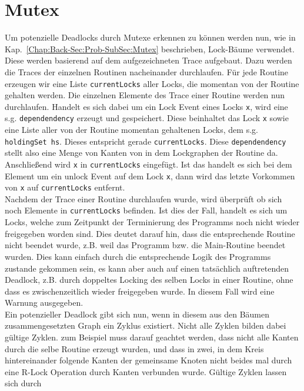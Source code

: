 \section{Mutex} \label{Chap:Implement-Sec:Mutex}
Um potenzielle Deadlocks durch Mutexe erkennen zu können werden nun, wie in 
Kap.~\ref{Chap:Back-Sec:Prob-SubSec:Mutex} beschrieben, Lock-Bäume verwendet.
Diese werden basierend auf dem aufgezeichneten Trace aufgebaut. Dazu werden die Traces der 
einzelnen Routinen nacheinander durchlaufen. Für jede Routine erzeugen wir eine Liste \texttt{currentLocks} aller 
Locks, die momentan von der Routine gehalten werden. Die einzelnen Elemente des Trace einer 
Routine werden nun durchlaufen. Handelt es sich dabei um ein Lock Event eines Locks \texttt{x}, 
wird eine s.g. \texttt{dependendency} erzeugt und gespeichert. Diese beinhaltet 
das Lock \texttt{x} sowie eine Liste aller von der Routine momentan gehaltenen 
Locks, dem s.g. \texttt{holdingSet hs}. Dieses entspricht gerade \texttt{currentLocks}. 
Diese \texttt{dependendency} stellt also 
eine Menge von Kanten von in dem Lockgraphen der Routine da. 
Anschließend wird \texttt{x} in \texttt{currentLocks} eingefügt.
Ist das handelt es sich bei dem Element um ein unlock Event auf dem Lock \texttt{x}, dann wird das 
letzte Vorkommen von \texttt{x} auf \texttt{currentLocks} entfernt.\\
Nachdem der Trace einer Routine durchlaufen wurde, wird überprüft ob sich noch Elemente in 
\texttt{currentLocks} befinden. Ist dies der Fall, handelt es sich um Locks, welche zum Zeitpunkt der Terminierung 
des Programms noch nicht wieder freigegeben worden sind. Dies deutet darauf hin, dass die
entsprechende Routine nicht beendet wurde, z.B. weil das Programm bzw. die Main-Routine beendet wurden.
Dies kann einfach durch die entsprechende Logik des Programms zustande gekommen sein, es kann aber auch 
auf einen tatsächlich auftretenden Deadlock, z.B. durch doppeltes Locking des selben Locks in einer Routine, ohne dass 
es zwischenzeitlich wieder freigegeben wurde. In diesem Fall wird eine Warnung ausgegeben.\\
Ein potenzieller Deadlock gibt sich nun, wenn in diesem aus den Bäumen zusammengesetzten 
Graph ein Zyklus existiert.
Nicht alle Zyklen bilden dabei gültige Zyklen. zum Beispiel muss darauf 
geachtet werden, dass nicht alle Kanten durch die selbe Routine erzeugt wurden, und dass in 
zwei, in dem Kreis hintereinander folgende Kanten der gemeinsame Knoten nicht beides mal durch eine 
R-Lock Operation durch Kanten verbunden wurde. Gültige Zyklen lassen sich durch 
